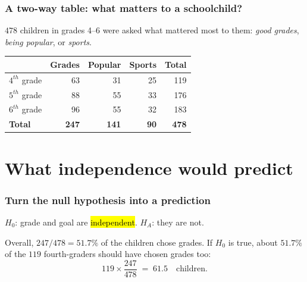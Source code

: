 \documentclass[slidestop,compress,mathserif]{beamer}
\begin{document}
\begin{frame}
\frametitle{A two-way table: what matters to a schoolchild?}

$478$ children in grades 4--6 were asked what mattered most to them: \emph{good grades}, \emph{being popular}, or \emph{sports}.

\vspace{0.3em}
{\small
\begin{center}
\begin{tabular}{lrrr|r}
\toprule
& Grades & Popular & Sports & \textbf{Total} \\
\midrule
$4^{th}$ grade & 63 & 31 & 25 & 119 \\
$5^{th}$ grade & 88 & 55 & 33 & 176 \\
$6^{th}$ grade & 96 & 55 & 32 & 183 \\
\midrule
\textbf{Total} & \textbf{247} & \textbf{141} & \textbf{90} & \textbf{478} \\
\bottomrule
\end{tabular}
\end{center}}

\vspace{0.3em}

\end{frame}

\section{What independence would predict}
\begin{frame}
\frametitle{Turn the null hypothesis into a prediction}

$H_0$: grade and goal are \hl{independent}. $H_A$: they are not.

\vspace{0.4em}

\vspace{0.4em}
Overall, $247/478 = 51.7\%$ of the children chose grades. If $H_0$ is true, about $51.7\%$ of the $119$ fourth-graders should have chosen grades too:
\[
119 \times \frac{247}{478} \;=\; 61.5 \quad\text{children.}
\]
\end{frame}
\end{document}
